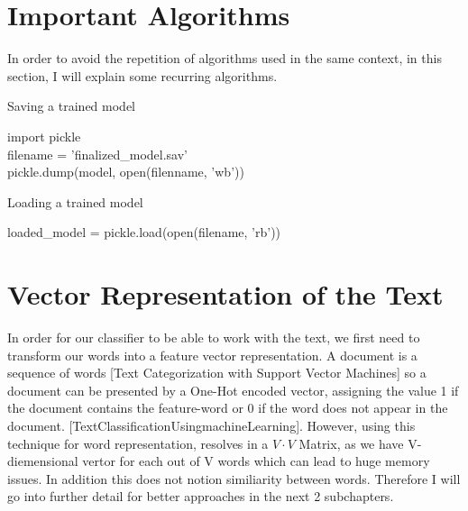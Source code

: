 \documentclass[a4paper, 11pt,titlepage,oneside,openany]{book}
\begin{document}
\section{Important Algorithms}
In order to avoid the repetition of algorithms used in the same context, in this section, I will explain some recurring algorithms.
\begin{algorithm}
	\caption{Saving a trained model}
	\label{save}
	\begin{algorithmic}
		\STATE import pickle \\
		\STATE filename = 'finalized\_model.sav' \\
		\STATE pickle.dump(model, open(filenname, 'wb')) \\
	\end{algorithmic}
\end{algorithm}
\begin{algorithm}
	\caption{Loading a trained model}
	\label{load}
	\begin{algorithmic}
		\STATE loaded\_model = pickle.load(open(filename, 'rb')) \\
	\end{algorithmic}
\end{algorithm}

\section{Vector Representation of the Text}
In order for our classifier to be able to work with the text, we first need to transform our words into a feature vector representation. A document is a sequence of words [Text Categorization with Support Vector Machines] so a document can be presented by a One-Hot encoded vector, assigning the value 1 if the document contains the feature-word or 0 if the word does not appear in the document. [TextClassificationUsingmachineLearning]. However, using this technique for word representation, resolves in a $V \cdot V$ Matrix, as we have V-diemensional vertor for each out of V words which can lead to huge memory issues. In addition this does not notion similiarity between words. Therefore I will go into further detail for better approaches in the next 2 subchapters.
\end{document}
